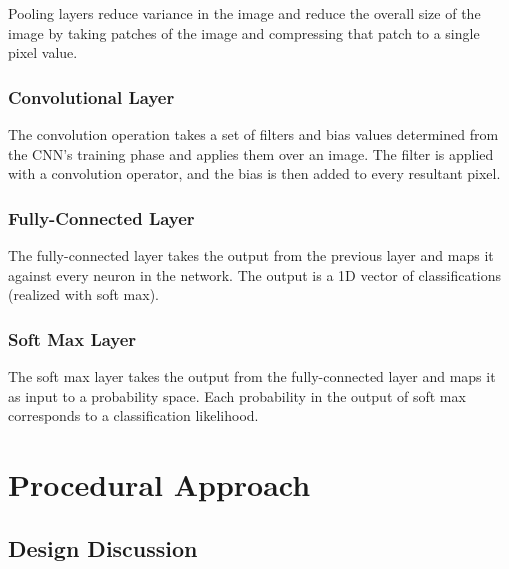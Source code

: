 \documentclass[11pt,english]{article}
\begin{document}
Pooling layers reduce variance in the image and reduce the overall size of the image by taking patches of the image and compressing that patch to a single pixel value.



\subsubsection{Convolutional Layer}

The convolution operation takes a set of filters and bias values determined from the CNN's training phase and applies them over an image.  The filter is applied with a convolution operator, and the bias is then added to every resultant pixel.



\subsubsection{Fully-Connected Layer}

The fully-connected layer takes the output from the previous layer and maps it against every neuron in the network.  The output is a 1D vector of classifications (realized with soft max).



\subsubsection{Soft Max Layer}

The soft max layer takes the output from the fully-connected layer and maps it as input to a probability space.  Each probability in the output of soft max corresponds to a classification likelihood.



\section{Procedural Approach}

\subsection{Design Discussion}
\end{document}
